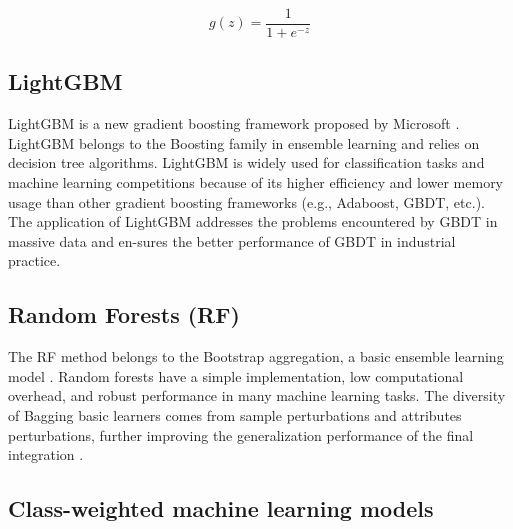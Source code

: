 \documentclass[a4paper,fleqn]{cas-sc}
\begin{document}
\begin{equation}
  g(z)=\frac{1}{1+e^{-z}}
  \label{eqn:gz}
\end{equation}

\subsection{LightGBM}

LightGBM is a new gradient boosting framework proposed by Microsoft \citep{Friedman2002_GBoost}. 
LightGBM belongs to the Boosting family in ensemble learning and relies on decision tree algorithms. 
LightGBM is widely used for classification tasks and machine learning competitions because of its higher efficiency and lower memory usage than other gradient boosting frameworks (e.g., Adaboost, GBDT, etc.). 
The application of LightGBM addresses the problems encountered by GBDT in massive data and en-sures the better performance of GBDT in industrial practice.

\subsection{Random Forests (RF)}

The RF method belongs to the Bootstrap aggregation, a basic ensemble learning model \citep{Breiman2001}. 
Random forests have a simple implementation, low computational overhead, and robust performance in many machine learning tasks. 
The diversity of Bagging basic learners comes from sample perturbations and attributes perturbations, further improving the generalization performance of the final integration \citep{Youssef2015Landslides}. 

\subsection{Class-weighted machine learning models}
\end{document}
